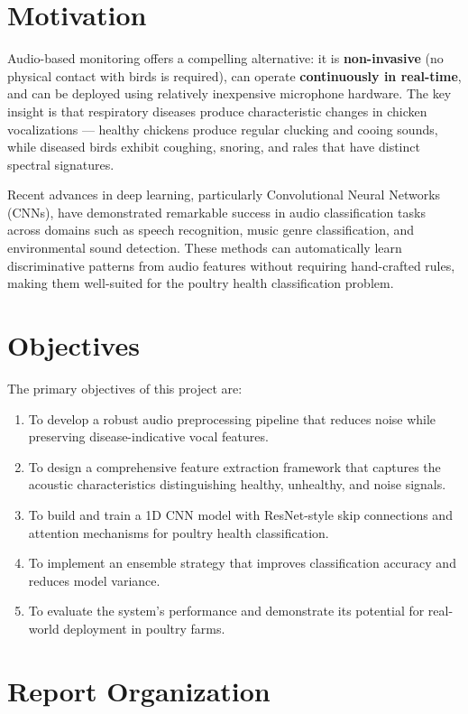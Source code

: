 \documentclass[12pt,a4paper]{report}
\begin{document}
\section{Motivation}

Audio-based monitoring offers a compelling alternative: it is \textbf{non-invasive} (no physical contact with birds is required), can operate \textbf{continuously in real-time}, and can be deployed using relatively inexpensive microphone hardware. The key insight is that respiratory diseases produce characteristic changes in chicken vocalizations --- healthy chickens produce regular clucking and cooing sounds, while diseased birds exhibit coughing, snoring, and rales that have distinct spectral signatures.

Recent advances in deep learning, particularly Convolutional Neural Networks (CNNs), have demonstrated remarkable success in audio classification tasks across domains such as speech recognition, music genre classification, and environmental sound detection. These methods can automatically learn discriminative patterns from audio features without requiring hand-crafted rules, making them well-suited for the poultry health classification problem.

\section{Objectives}

The primary objectives of this project are:
\begin{enumerate}
    \item To develop a robust audio preprocessing pipeline that reduces noise while preserving disease-indicative vocal features.
    \item To design a comprehensive feature extraction framework that captures the acoustic characteristics distinguishing healthy, unhealthy, and noise signals.
    \item To build and train a 1D CNN model with ResNet-style skip connections and attention mechanisms for poultry health classification.
    \item To implement an ensemble strategy that improves classification accuracy and reduces model variance.
    \item To evaluate the system's performance and demonstrate its potential for real-world deployment in poultry farms.
\end{enumerate}

\section{Report Organization}
\end{document}
